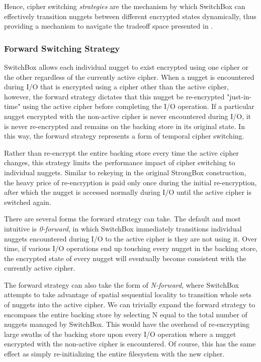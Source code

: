 Hence, cipher switching \emph{strategies} are the mechanism by which SwitchBox
can effectively transition nuggets between different encrypted states
dynamically, thus providing a mechanism to navigate the tradeoff space presented
in .  

\subsubsection{Forward Switching Strategy}

SwitchBox allows each individual nugget to exist encrypted using one cipher or
the other regardless of the currently active cipher. When a nugget is
encountered during I/O that is encrypted using a cipher other than the active
cipher, however, the forward strategy dictates that this nugget be re-encrypted
"just-in-time" using the active cipher before completing the I/O operation. If a
particular nugget encrypted with the non-active cipher is never encountered
during I/O, it is never re-encrypted and remains on the backing store in its
original state. In this way, the forward strategy represents a form of temporal
cipher switching.

Rather than re-encrypt the entire backing store every time the active cipher
changes, this strategy limits the performance impact of cipher switching to
individual nuggets. Similar to rekeying in the original StrongBox construction,
the heavy price of re-encryption is paid only once during the initial
re-encryption, after which the nugget is accessed normally during I/O until the
active cipher is switched again.

There are several forms the forward strategy can take. The default and most
intuitive is \emph{0-forward}, in which SwitchBox immediately transitions
individual nuggets encountered during I/O to the active cipher is they are not
using it. Over time, if various I/O operations end up touching every nugget in
the backing store, the encrypted state of every nugget will eventually become
consistent with the currently active cipher.

The forward strategy can also take the form of \emph{N-forward}, where SwitchBox
attempts to take advantage of spatial sequential locality to transition whole
sets of nuggets into the active cipher. We can trivially expand the forward
strategy to encompass the entire backing store by selecting N equal to the total
number of nuggets managed by SwitchBox. This would have the overhead of
re-encrypting large swaths of the backing store upon every I/O operation where a
nugget encrypted with the non-active cipher is encountered. Of course, this has
the same effect as simply re-initializing the entire filesystem with the new
cipher.

